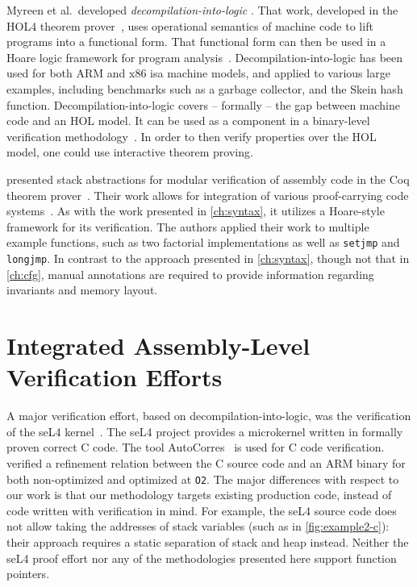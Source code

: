 Myreen et al.\ developed \emph{decompilation-into-logic} \citep{myreen2007hoare,myreen2008decompilation,myreen2012decompilation}.
That work, developed in the HOL4 theorem prover~\citep{slind2008brief},
uses operational semantics of machine code to lift programs into a functional form.
That functional form can then be used in a Hoare logic framework
for program analysis~\citep{myreen2007hoare}.
Decompilation-into-logic has been used for both ARM and x86 \ac{isa} machine models, and applied to various large examples, including benchmarks such as a garbage collector, and the Skein hash function.
Decompilation-into-logic covers -- formally -- the gap between machine code
and an HOL model.
It can be used as a component
in a binary-level verification methodology~\citep{sewell2013tvv}.
In order to then verify properties over the HOL model,
one could use interactive theorem proving.

\citet{feng2006modular,feng2005sbca} presented stack abstractions
for modular verification of assembly code
in the Coq theorem prover~\citep{chlipala2013certified}.
Their work allows for integration
of various proof-carrying code systems~\citep{necula1997proof}.
As with the work presented in \cref{ch:syntax},
it utilizes a Hoare-style framework for its verification.
The authors applied their work to multiple example functions,
such as two factorial implementations
as well as \lstinline[language=C]|setjmp| and \lstinline[language=C]|longjmp|.
In contrast to the approach presented in \cref{ch:syntax},
though not that in \cref{ch:cfg},
manual annotations are required to provide information regarding invariants and memory layout.

\section{Integrated Assembly-Level Verification Efforts}
A major verification effort, based on decompilation-into-logic,
was the verification of the seL4 kernel~\citep{klein2009sel4,Klein_AEMSKH_14}.
The seL4 project provides a microkernel written in formally proven correct C code.
The tool AutoCorres~\citep{greenaway2012bridging} is used for C code verification.
\citet{sewell2013tvv} verified a refinement relation between the C source code
and an ARM binary for both non-optimized and optimized at \lstinline{O2}.
The major differences with respect to our work
is that our methodology targets existing production code,
instead of code written with verification in mind.
For example, the seL4 source code does not allow taking the addresses of stack variables
(such as in \cref{fig:example2-c}):
their approach requires a static separation of stack and heap instead.
Neither the seL4 proof effort nor any of the methodologies presented here
support function pointers.

